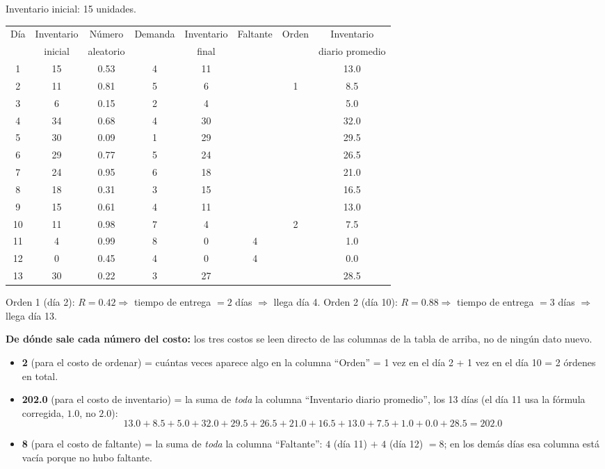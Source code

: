 \documentclass[12pt]{article}
\begin{document}
Inventario inicial: 15 unidades.

\begin{center}
\small
\begin{tabular}{cccccccc}
\toprule
\multirow{2}{*}{Día} & Inventario & Número & \multirow{2}{*}{Demanda} & Inventario & \multirow{2}{*}{Faltante} & \multirow{2}{*}{Orden} & Inventario \\
 & inicial & aleatorio & & final & & & diario promedio \\
\midrule
1  & 15 & 0.53 & 4 & 11 &   &   & 13.0 \\
2  & 11 & 0.81 & 5 & 6  &   & 1 & 8.5  \\
3  & 6  & 0.15 & 2 & 4  &   &   & 5.0  \\
4  & 34 & 0.68 & 4 & 30 &   &   & 32.0 \\
5  & 30 & 0.09 & 1 & 29 &   &   & 29.5 \\
6  & 29 & 0.77 & 5 & 24 &   &   & 26.5 \\
7  & 24 & 0.95 & 6 & 18 &   &   & 21.0 \\
8  & 18 & 0.31 & 3 & 15 &   &   & 16.5 \\
9  & 15 & 0.61 & 4 & 11 &   &   & 13.0 \\
10 & 11 & 0.98 & 7 & 4  &   & 2 & 7.5  \\
11 & 4  & 0.99 & 8 & 0  & 4 &   & 1.0  \\
12 & 0  & 0.45 & 4 & 0  & 4 &   & 0.0  \\
13 & 30 & 0.22 & 3 & 27 &   &   & 28.5 \\
\bottomrule
\end{tabular}
\end{center}

Orden 1 (día 2): $R=0.42 \Rightarrow$ tiempo de entrega $=2$ días $\Rightarrow$ llega día 4.
Orden 2 (día 10): $R=0.88 \Rightarrow$ tiempo de entrega $=3$ días $\Rightarrow$ llega día 13.

\textbf{De dónde sale cada número del costo:} los tres costos se leen directo de las columnas de la tabla de arriba, no de ningún dato nuevo.

\begin{itemize}
    \item \textbf{2} (para el costo de ordenar) = cuántas veces aparece algo en la columna ``Orden'' = 1 vez en el día 2 + 1 vez en el día 10 = 2 órdenes en total.
    \item \textbf{202.0} (para el costo de inventario) = la suma de \emph{toda} la columna ``Inventario diario promedio'', los 13 días (el día 11 usa la fórmula corregida, $1.0$, no $2.0$):
    \[
    13.0+8.5+5.0+32.0+29.5+26.5+21.0+16.5+13.0+7.5+1.0+0.0+28.5 = 202.0
    \]
    \item \textbf{8} (para el costo de faltante) = la suma de \emph{toda} la columna ``Faltante'': $4$ (día 11) $+$ $4$ (día 12) $= 8$; en los demás días esa columna está vacía porque no hubo faltante.
\end{itemize}
\end{document}
